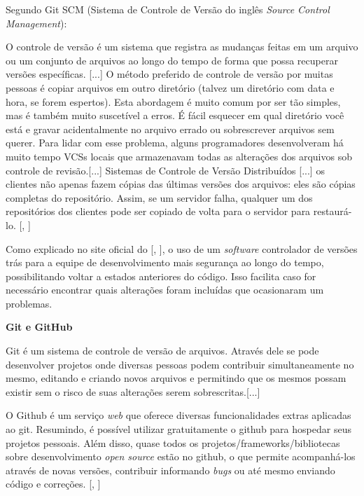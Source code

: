 \documentclass[
	12pt,				%
	oneside,			%
	a4paper,			%
	brazil				%
]{abntex2}
\newcommand{\citecustom}[1]{[\citeauthoronline{#1}, \citeyear{#1}]}
\begin{document}
Segundo Git SCM (Sistema de Controle de Versão do inglês \textit{Source Control Management}):

\begin{citacao}
O controle de versão é um sistema que registra as mudanças feitas em um arquivo ou um conjunto de arquivos ao longo do tempo de forma que possa recuperar versões específicas. [...]
O método preferido de controle de versão por muitas pessoas é copiar arquivos em outro diretório (talvez um diretório com data e hora, se forem espertos). Esta abordagem é muito comum por ser tão simples, mas é também muito suscetível a erros. É fácil esquecer em qual diretório você está e gravar acidentalmente no arquivo errado ou sobrescrever arquivos sem querer. Para lidar com esse problema, alguns programadores desenvolveram há muito tempo VCSs locais que armazenavam todas as alterações dos arquivos sob controle de revisão.[...]
Sistemas de Controle de Versão Distribuídos [...] os clientes não apenas fazem cópias das últimas versões dos arquivos: eles são cópias completas do repositório. Assim, se um servidor falha, qualquer um dos repositórios dos clientes pode ser copiado de volta para o servidor para restaurá-lo. \citecustom{Git2016}
\end{citacao}

Como explicado no site oficial do \citecustom{Git2016}, o uso de um \textit{software} controlador de versões trás para a equipe de desenvolvimento mais segurança ao longo do tempo, possibilitando voltar a estados anteriores do código. Isso facilita caso for necessário encontrar quais alterações foram incluídas que ocasionaram um problemas.

\textbf{Git e GitHub}

\begin{citacao}
Git é um sistema de controle de versão de arquivos. Através dele se pode desenvolver projetos onde diversas pessoas podem contribuir simultaneamente no mesmo, editando e criando novos arquivos e permitindo que os mesmos possam existir sem o risco de suas alterações serem sobrescritas.[...]

O Github é um serviço \textit{web} que oferece diversas funcionalidades extras aplicadas ao git. Resumindo, é possível utilizar gratuitamente o github para hospedar seus projetos pessoais. Além disso, quase todos os projetos/frameworks/bibliotecas sobre desenvolvimento \textit{open source} estão no github, o que permite acompanhá-los através de novas versões, contribuir informando \textit{bugs} ou até mesmo enviando código e correções. \citecustom{Schmitz2015}
\end{citacao}
\end{document}
